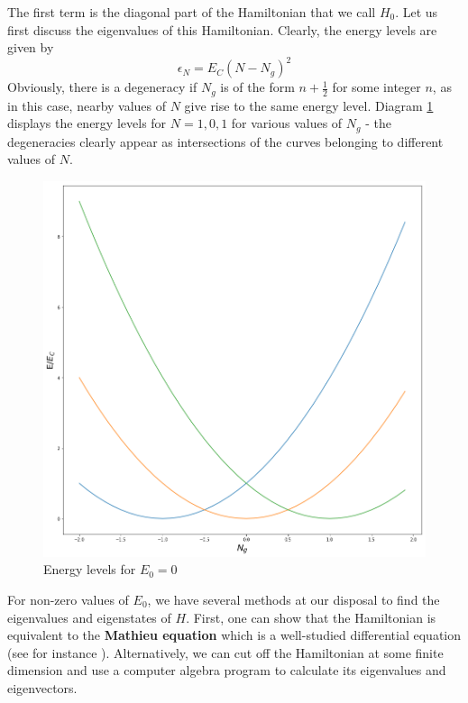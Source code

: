 \documentclass[a4paper, draft]{article}
\theoremstyle{own}
\theoremstyle{remark}
\begin{document}
The first term is the diagonal part of the Hamiltonian that we call $H_0$. Let us first discuss the eigenvalues of this Hamiltonian. Clearly, the energy levels are given by
$$
\epsilon_N = E_C (N - N_g)^2 
$$
Obviously, there is a degeneracy if $N_g$ is of the form $n + \frac{1}{2}$ for some integer $n$, as in this case, nearby values of $N$ give rise to the same energy level. Diagram \ref{fig:CooperPairBoxEnergyLevels_unperturbed} displays the energy levels for $N=1,0,1$ for various values of $N_g$ - the degeneracies clearly appear as intersections of the curves belonging to different values of $N$.

\begin{figure}[ht]
\centering
\includegraphics[width=0.7\linewidth]{images/CooperPairBoxEnergyLevels_unperturbed}
\caption[Energy levels for $E_0=0$]{Energy levels for $E_0=0$}
\label{fig:CooperPairBoxEnergyLevels_unperturbed}
\end{figure}

For non-zero values of $E_0$, we have several methods at our disposal to find the eigenvalues and eigenstates of $H$. First, one can show that the Hamiltonian is equivalent to the {\bf Mathieu equation} which is a well-studied differential equation (see for instance \cite{DevoretWallraffMartinis}). Alternatively, we can cut off the Hamiltonian at some finite dimension and use a computer algebra program to calculate its eigenvalues and eigenvectors.
\end{document}
